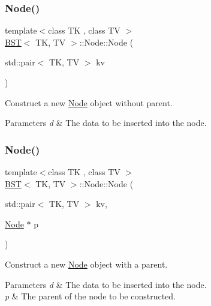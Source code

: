 \subsubsection{\texorpdfstring{Node()}{Node()}\hspace{0.1cm}{\footnotesize\ttfamily [1/3]}}
{\footnotesize\ttfamily template$<$class TK , class TV $>$ \\
\hyperlink{classBST}{B\+ST}$<$ TK, TV $>$\+::Node\+::\+Node (\begin{DoxyParamCaption}\item[{std\+::pair$<$ TK, TV $>$}]{kv }\end{DoxyParamCaption})\hspace{0.3cm}{\ttfamily [inline]}}



Construct a new \hyperlink{structBST_1_1Node}{Node} object without parent. 


\begin{DoxyParams}{Parameters}
{\em d} & The data to be inserted into the node. \\
\hline
\end{DoxyParams}
\mbox{\label{structBST_1_1Node_a54fee90481370a764040973e0eb36a7d}} 
\subsubsection{\texorpdfstring{Node()}{Node()}\hspace{0.1cm}{\footnotesize\ttfamily [2/3]}}
{\footnotesize\ttfamily template$<$class TK , class TV $>$ \\
\hyperlink{classBST}{B\+ST}$<$ TK, TV $>$\+::Node\+::\+Node (\begin{DoxyParamCaption}\item[{std\+::pair$<$ TK, TV $>$}]{kv,  }\item[{\hyperlink{structBST_1_1Node}{Node} $\ast$}]{p }\end{DoxyParamCaption})\hspace{0.3cm}{\ttfamily [inline]}}



Construct a new \hyperlink{structBST_1_1Node}{Node} object with a parent. 


\begin{DoxyParams}{Parameters}
{\em d} & The data to be inserted into the node. \\
\hline
{\em p} & The parent of the node to be constructed. \\
\hline
\end{DoxyParams}
\mbox{\label{structBST_1_1Node_a841809e77bda00ce2a684c709c4e6e1b}} 
